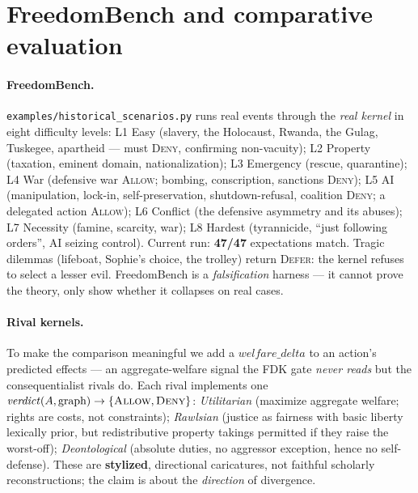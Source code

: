 \documentclass[11pt]{article}
\newcommand{\Allow}{\textsc{Allow}}
\newcommand{\Deny}{\textsc{Deny}}
\newcommand{\Defer}{\textsc{Defer}}
\begin{document}
\section{FreedomBench and comparative evaluation}
\label{sec:bench}

\paragraph{FreedomBench.} \texttt{examples/historical\_scenarios.py} runs real events through
the \emph{real kernel} in eight difficulty levels: L1 Easy (slavery, the Holocaust, Rwanda,
the Gulag, Tuskegee, apartheid --- must \Deny, confirming non-vacuity); L2 Property
(taxation, eminent domain, nationalization); L3 Emergency (rescue, quarantine); L4 War
(defensive war \Allow; bombing, conscription, sanctions \Deny); L5 AI (manipulation, lock-in,
self-preservation, shutdown-refusal, coalition \Deny; a delegated action \Allow); L6 Conflict
(the defensive asymmetry and its abuses); L7 Necessity (famine, scarcity, war); L8 Hardest
(tyrannicide, ``just following orders'', AI seizing control). Current run: \textbf{47/47}
expectations match. Tragic dilemmas (lifeboat, Sophie's choice, the trolley) return \Defer:
the kernel refuses to select a lesser evil. FreedomBench is a \emph{falsification} harness ---
it cannot prove the theory, only show whether it collapses on real cases.

\paragraph{Rival kernels.} To make the comparison meaningful we add a $\mathit{welfare\_delta}$
to an action's predicted effects --- an aggregate-welfare signal the FDK gate \emph{never
reads} but the consequentialist rivals do. Each rival implements one
$\mathit{verdict}(A,\text{graph})\to\{\Allow,\Deny\}$: \emph{Utilitarian} (maximize aggregate
welfare; rights are costs, not constraints); \emph{Rawlsian} (justice as fairness with basic
liberty lexically prior, but redistributive property takings permitted if they raise the
worst-off); \emph{Deontological} (absolute duties, no aggressor exception, hence no
self-defense). These are \textbf{stylized}, directional caricatures, not faithful scholarly
reconstructions; the claim is about the \emph{direction} of divergence.
\end{document}
